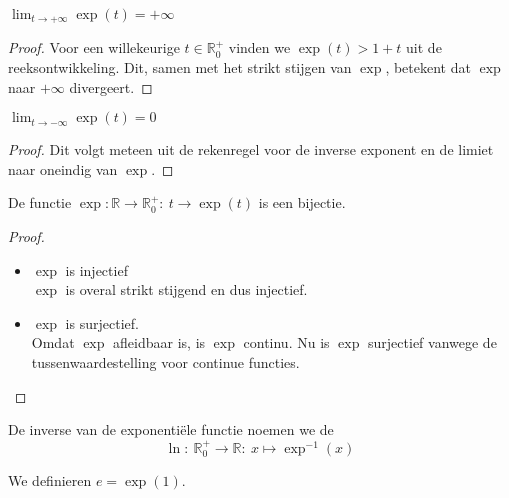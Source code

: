 \documentclass[main.tex]{subfiles}
\begin{document}
\begin{bpr}
  $\lim_{t \rightarrow +\infty}\exp(t) = +\infty$

  \begin{proof}
    Voor een willekeurige $t\in \mathbb{R}_{0}^{+}$ vinden we $\exp(t) > 1 + t$ uit de reeksontwikkeling.
    Dit, samen met het strikt stijgen van $\exp$, betekent dat $\exp$ naar $+\infty$ divergeert.
  \end{proof}
\end{bpr}

\begin{bpr}
  $\lim_{t \rightarrow -\infty}\exp(t) = 0$

  \begin{proof}
    Dit volgt meteen uit de rekenregel voor de inverse exponent en de limiet naar oneindig van $\exp$.
  \end{proof}
\end{bpr}

\begin{bpr}
  De functie $\exp: \mathbb{R} \rightarrow \mathbb{R}_{0}^{+}:\ t \rightarrow \exp(t)$ is een bijectie.

  \begin{proof}
    \begin{itemize}
    \item $\exp$ is injectief\\
      $\exp$ is overal strikt stijgend en dus injectief.
    \item $\exp$ is surjectief.\\
      Omdat $\exp$ afleidbaar is, is $\exp$ continu.
      Nu is $\exp$ surjectief vanwege de tussenwaardestelling voor continue functies.
    \end{itemize}
  \end{proof}
\end{bpr}

\begin{de}
  De inverse van de exponenti\"ele functie noemen we de 
  \[ \ln:\ \mathbb{R}_{0}^{+}\rightarrow \mathbb{R}:\ x \mapsto \exp^{-1}(x) \]
\end{de}


\begin{de}
  We definieren $e = \exp(1)$.
\end{de}
\end{document}
